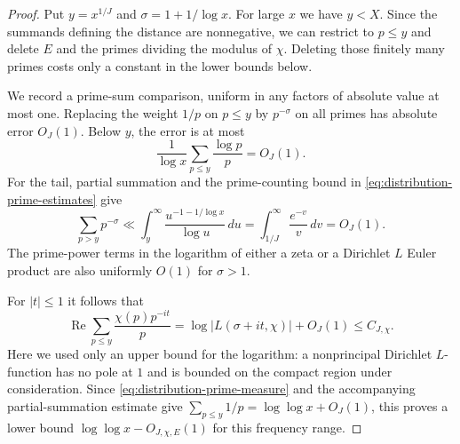 \begin{proof}
Put $y=x^{1/J}$ and $\sigma=1+1/\log x$.  For large $x$ we have
$y<X$.  Since the summands defining the distance are nonnegative,
we can restrict to $p\leq y$ and delete $E$ and the primes dividing
the modulus of $\chi$.  Deleting those finitely many primes costs only
a constant in the lower bounds below.

We record a prime-sum comparison, uniform in any factors of absolute
value at most one.  Replacing the weight $1/p$ on $p\leq y$ by
$p^{-\sigma}$ on all primes has absolute error $O_J(1)$.  Below $y$,
the error is at most
\[
 \frac1{\log x}\sum_{p\leq y}\frac{\log p}{p}=O_J(1).
\]
For the tail, partial summation and the prime-counting bound in
\eqref{eq:distribution-prime-estimates} give
\[
 \sum_{p>y}p^{-\sigma}
 \ll\int_y^\infty\frac{u^{-1-1/\log x}}{\log u}\,du
 =\int_{1/J}^\infty\frac{e^{-v}}v\,dv=O_J(1).
\]
The prime-power terms in the logarithm of either a zeta or a Dirichlet
$L$ Euler product are also uniformly $O(1)$ for $\sigma>1$.

For $|t|\leq1$ it follows that
\[
 \operatorname{Re}\sum_{p\leq y}\frac{\chi(p)p^{-it}}p
 =\log|L(\sigma+it,\chi)|+O_J(1)\leq C_{J,\chi}.
\]
Here we used only an upper bound for the logarithm: a nonprincipal
Dirichlet $L$-function has no pole at $1$ and is bounded on the compact
region under consideration.  Since \eqref{eq:distribution-prime-measure}
and the accompanying partial-summation estimate give
$\sum_{p\leq y}1/p=\log\log x+O_J(1)$, this proves a lower bound
$\log\log x-O_{J,\chi,E}(1)$ for this frequency range.


\end{proof}
